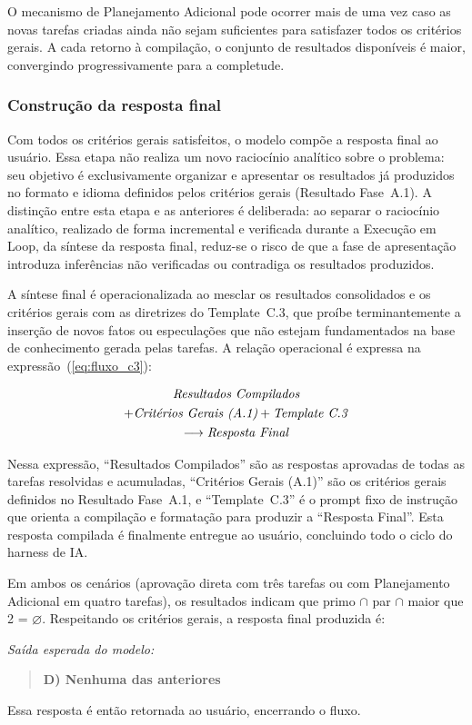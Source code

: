 \documentclass[a4paper,10pt,twocolumn]{article}
\newcommand{\saidaLLM}{%
  \smallskip\noindent\textit{Saída esperada do modelo:}\smallskip\par
}
\begin{document}
O mecanismo de Planejamento Adicional pode ocorrer mais de uma vez caso as novas tarefas criadas ainda não sejam suficientes para satisfazer todos os critérios gerais. A cada retorno à compilação, o conjunto de resultados disponíveis é maior, convergindo progressivamente para a completude.


\subsubsection{Construção da resposta final} \label{subsec:RespostaC3}

Com todos os critérios gerais satisfeitos, o modelo compõe a resposta final ao usuário. Essa etapa não realiza um novo raciocínio analítico sobre o problema: seu objetivo é exclusivamente organizar e apresentar os resultados já produzidos no formato e idioma definidos pelos critérios gerais (Resultado Fase~A.1). A distinção entre esta etapa e as anteriores é deliberada: ao separar o raciocínio analítico, realizado de forma incremental e verificada durante a Execução em Loop, da síntese da resposta final, reduz-se o risco de que a fase de apresentação introduza inferências não verificadas ou contradiga os resultados produzidos.

A síntese final é operacionalizada ao mesclar os resultados consolidados e os critérios gerais com as diretrizes do Template~C.3, que proíbe terminantemente a inserção de novos fatos ou especulações que não estejam fundamentados na base de conhecimento gerada pelas tarefas. A relação operacional é expressa na expressão~(\ref{eq:fluxo_c3}):

\begin{multline} \label{eq:fluxo_c3}
\text{\textit{Resultados Compilados}} \\
+ \text{\textit{Critérios Gerais (A.1)}} + \text{\textit{Template C.3}} \\
\longrightarrow \text{\textit{Resposta Final}}
\end{multline}

Nessa expressão, ``Resultados Compilados'' são as respostas aprovadas de todas as tarefas resolvidas e acumuladas, ``Critérios Gerais (A.1)'' são os critérios gerais definidos no Resultado Fase~A.1, e ``Template~C.3'' é o prompt fixo de instrução que orienta a compilação e formatação para produzir a ``Resposta Final''. Esta resposta compilada é finalmente entregue ao usuário, concluindo todo o ciclo do harness de IA.

\begin{exemplo}
Em ambos os cenários (aprovação direta com três tarefas ou com Planejamento Adicional em quatro tarefas), os resultados indicam que primo $\cap$ par $\cap$ maior que 2 = $\varnothing$. Respeitando os critérios gerais, a resposta final produzida é:

\saidaLLM

\begin{quote}
\textbf{D) Nenhuma das anteriores}
\end{quote}

Essa resposta é então retornada ao usuário, encerrando o fluxo.
\end{exemplo}
\end{document}
